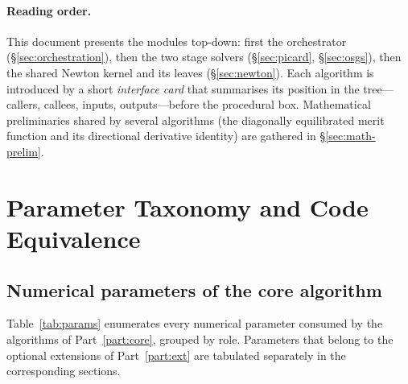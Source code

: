 \documentclass{article}
\begin{document}
\paragraph{Reading order.}  This document presents the modules
top-down: first the orchestrator (§\ref{sec:orchestration}), then the
two stage solvers (§\ref{sec:picard}, §\ref{sec:osgs}), then the shared
Newton kernel and its leaves (§\ref{sec:newton}). Each algorithm is
introduced by a short \emph{interface card} that summarises its
position in the tree---callers, callees, inputs, outputs---before the
procedural box. Mathematical preliminaries shared by several algorithms
(the diagonally equilibrated merit function and its directional
derivative identity) are gathered in §\ref{sec:math-prelim}.

\section{Parameter Taxonomy and Code Equivalence}
\label{sec:params}

\subsection{Numerical parameters of the core algorithm}

Table~\ref{tab:params} enumerates every numerical parameter consumed by
the algorithms of Part~\ref{part:core}, grouped by role. Parameters
that belong to the optional extensions of Part~\ref{part:ext} are
tabulated separately in the corresponding sections.
\end{document}
